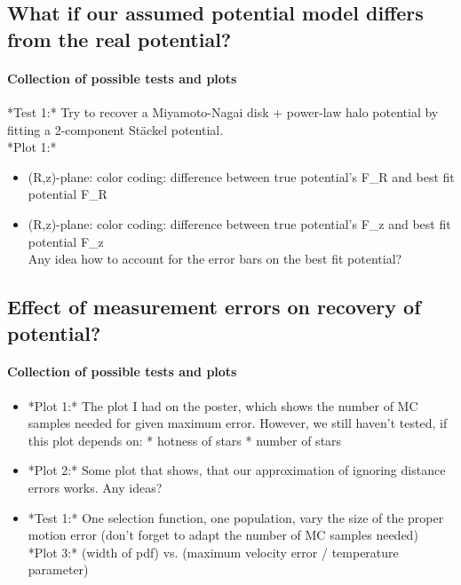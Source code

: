 \documentclass[12pt,preprint]{aastex}
\begin{document}
\subsection{What if our assumed potential model differs from the real potential?}

\paragraph{Collection of possible tests and plots}

*Test 1:* Try to recover a Miyamoto-Nagai disk + power-law halo potential by fitting a 2-component St\"ackel potential. \\
*Plot 1:* 
\begin{itemize}
   \item (R,z)-plane: color coding: difference between true potential's F\_R and best fit potential F\_R
    \item (R,z)-plane: color coding: difference between true potential's F\_z and best fit potential F\_z \\
    Any idea how to account for the error bars on the best fit potential?
\end{itemize}

\subsection{Effect of measurement errors on recovery of potential?}

\paragraph{Collection of possible tests and plots}

\begin{itemize}
\item *Plot 1:* The plot I had on the poster, which shows the number of MC samples needed for given maximum error. However, we still haven't tested, if this plot depends on: 
    * hotness of stars
    * number of stars
\item *Plot 2:* Some plot that shows, that our approximation of ignoring distance errors works. Any ideas?
\item *Test 1:* One selection function, one population, vary the size of the proper motion error (don't forget to adapt the number of MC samples needed) \\
*Plot 3:* (width of pdf) vs. (maximum velocity error / temperature parameter)
\end{itemize}
\end{document}
